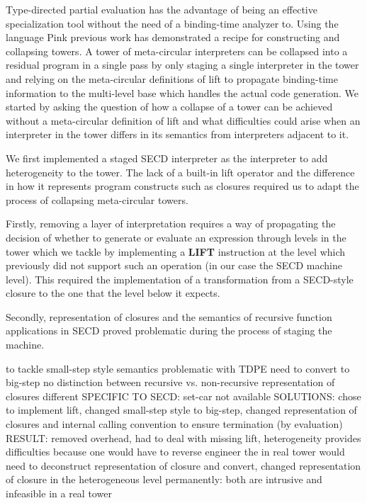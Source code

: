 \documentclass[a4paper,12pt,twoside,openright]{report}
\theoremstyle{definition}
\begin{document}
Type-directed partial evaluation has the advantage of being an effective specialization tool without the need of a binding-time analyzer to. Using the language Pink previous work has demonstrated a recipe for constructing and collapsing towers. A tower of meta-circular interpreters can be collapsed into a residual program in a single pass by only staging a single interpreter in the tower and relying on the meta-circular definitions of lift to propagate binding-time information to the multi-level base which handles the actual code generation. We started by asking the question of how a collapse of a tower can be achieved without a meta-circular definition of lift and what difficulties could arise when an interpreter in the tower differs in its semantics from interpreters adjacent to it.

We first implemented a staged SECD interpreter as the interpreter to add heterogeneity to the tower. The lack of a built-in lift operator and the difference in how it represents program constructs such as closures required us to adapt the process of collapsing meta-circular towers.

Firstly, removing a layer of interpretation requires a way of propagating the decision of whether to generate or evaluate an expression through levels in the tower which we tackle by implementing a \textbf{LIFT} instruction at the level which previously did not support such an operation (in our case the SECD machine level). This required the implementation of a transformation from a SECD-style closure to the one that the level below it expects.

Secondly, representation of closures and the semantics of recursive function applications in SECD proved problematic during the process of staging the machine.

to tackle small-step style semantics problematic with TDPE
            need to convert to big-step
        no distinction between recursive vs. non-recursive
        representation of closures different
    SPECIFIC TO SECD:
        set-car not available
SOLUTIONS: chose to implement lift, changed small-step style to big-step, changed representation of closures and internal calling convention to ensure termination (by evaluation)
RESULT: removed overhead, had to deal with missing lift, heterogeneity provides difficulties because one would have to reverse engineer the 
in real tower would need to deconstruct representation of closure and convert, changed representation of closure in the heterogeneous level permanently: both are intrusive and infeasible in a real tower
\end{document}
